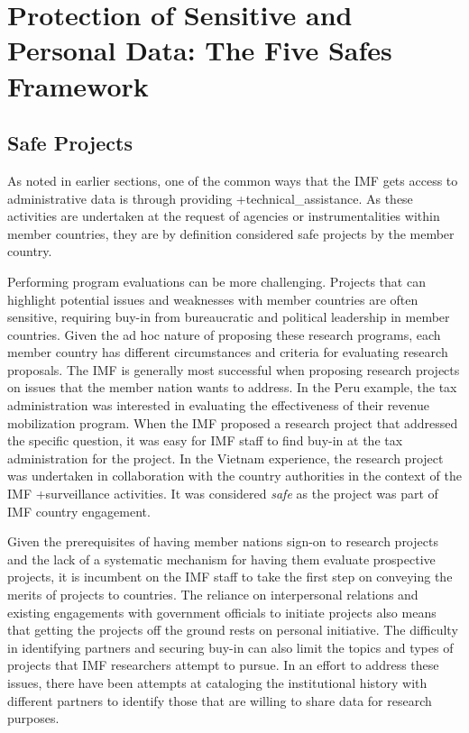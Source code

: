 \documentclass[
]{book}
\begin{document}
\hypertarget{protection-of-sensitive-and-personal-data-the-five-safes-framework-8}{%
\section{Protection of Sensitive and Personal Data: The Five Safes Framework}\label{protection-of-sensitive-and-personal-data-the-five-safes-framework-8}}

\hypertarget{safe-projects-8}{%
\subsection{Safe Projects}\label{safe-projects-8}}

As noted in earlier sections, one of the common ways that the IMF gets access to administrative data is through providing +technical\_assistance\textbar. As these activities are undertaken at the request of agencies or instrumentalities within member countries, they are by definition considered safe projects by the member country.

Performing program evaluations can be more challenging. Projects that can highlight potential issues and weaknesses with member countries are often sensitive, requiring buy-in from bureaucratic and political leadership in member countries. Given the ad hoc nature of proposing these research programs, each member country has different circumstances and criteria for evaluating research proposals. The IMF is generally most successful when proposing research projects on issues that the member nation wants to address. In the Peru example, the tax administration was interested in evaluating the effectiveness of their revenue mobilization program. When the IMF proposed a research project that addressed the specific question, it was easy for IMF staff to find buy-in at the tax administration for the project. In the Vietnam experience, the research project was undertaken in collaboration with the country authorities in the context of the IMF +surveillance\textbar{} activities. It was considered \emph{safe} as the project was part of IMF country engagement.

Given the prerequisites of having member nations sign-on to research projects and the lack of a systematic mechanism for having them evaluate prospective projects, it is incumbent on the IMF staff to take the first step on conveying the merits of projects to countries. The reliance on interpersonal relations and existing engagements with government officials to initiate projects also means that getting the projects off the ground rests on personal initiative. The difficulty in identifying partners and securing buy-in can also limit the topics and types of projects that IMF researchers attempt to pursue. In an effort to address these issues, there have been attempts at cataloging the institutional history with different partners to identify those that are willing to share data for research purposes.
\end{document}
